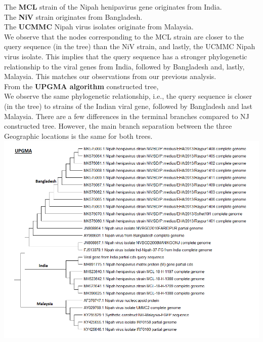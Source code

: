\documentclass[solution,addpoints,12pt]{exam}
\begin{document}
\begin{questions}
\begin{parts}
\begin{solution}
The \textbf{MCL} strain of the Nipah henipavirus gene originates from India.\\
The \textbf{NiV} strain originates from Bangladesh.\\
The \textbf{UCMMC} Nipah virus isolates originate from Malaysia.\\
We observe that the nodes corresponding to the MCL strain are closer to the query sequence (in the tree) than the NiV strain, and lastly, the UCMMC Nipah virus isolate. This implies that the query sequence has a stronger phylogenetic relationship to the viral genes from India, followed by Bangladesh and, lastly, Malaysia. This matches our observations from our previous analysis.\vspace{2mm} 
\\
From the \textbf{UPGMA algorithm} constructed tree,\\We observe the same phylogenetic relationship, i.e., the query sequence is closer (in the tree) to strains of the Indian viral gene, followed by Bangladesh and last Malaysia. There are a few differences in the terminal branches compared to NJ constructed tree. However, the main branch separation between the three Geographic locations is the same for both trees.\\

\includegraphics[width=\textwidth]{upgma}
    \end{solution}
    

\end{parts}
\end{questions}
\end{document}
